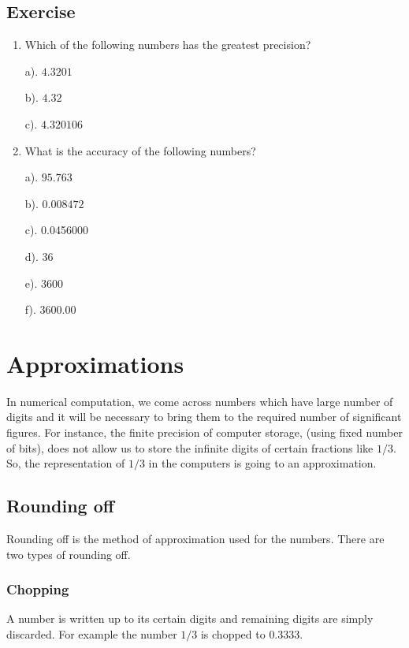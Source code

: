 \documentclass[aima203_lecturenotes_ku.tex]{subfiles}
\begin{document}
\subsection{Exercise}
\begin{enumerate}
\item Which of the following numbers has the  greatest precision?
  \begin{multicols}{3}
    a). $4.3201$

    \columnbreak

    b). $4.32$

    \columnbreak
    c). $4.320106$
  \end{multicols}

\item What is the accuracy of the following numbers?
  \begin{multicols}{6}
    a). $95.763$

    \columnbreak

    b). $0.008472$

    \columnbreak

    c). 0.0456000

    \columnbreak
    d). $36$

    \columnbreak
    e). $3600$

    \columnbreak
    f). $3600.00$
  \end{multicols}

\end{enumerate}
\section{Approximations}
In numerical computation, we come across numbers which have large number of digits and it will be necessary to bring them to the required number of significant figures. For instance, the finite precision of computer storage, (using fixed number of bits), does not allow us to store the infinite digits of certain fractions like $1/3$. So, the representation of $1/3$ in the computers is going to an approximation.
\subsection{Rounding off}
Rounding off is the method of approximation used for the numbers. There are two types of rounding off.

\subsubsection{Chopping}
A number is written up to its certain digits and remaining digits are simply discarded. For example the number $1/3$ is chopped to $0.3333$.
\end{document}
